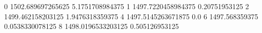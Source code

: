 0 1502.689697265625 5.1751708984375
1 1497.7220458984375 0.20751953125
2 1499.462158203125 1.9476318359375
4 1497.5145263671875 0.0
6 1497.568359375 0.0538330078125
8 1498.0196533203125 0.505126953125
